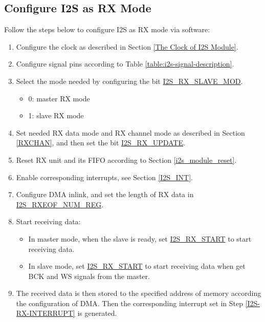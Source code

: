 \documentclass[main\_\_CN.tex]{subfiles}
\begin{document}
\subsection{ Configure I2S as RX Mode}\label{sec:configure-i2s-as-rx-mode}
Follow the steps below to configure I2S as RX mode via software:

\begin{enumerate}
    \item Configure the clock as described in Section  \ref{The Clock of I2S Module}.

    \item Configure signal pins according to Table  \ref{table:i2s-signal-description}.

    \item Select the mode needed by configuring the bit \hyperref[fielddesc:I2SRXSLAVEMOD]{ I2S\_RX\_SLAVE\_MOD}.
    \begin{itemize}
        \item 0: master RX mode
        \item 1: slave RX mode
    \end{itemize}

    \item Set needed RX data mode and RX channel mode as described in Section  \ref{RXCHAN}, and then set the bit  \hyperref[fielddesc:I2SRXUPDATE]{I2S\_RX\_UPDATE}.

    \item Reset RX unit and its FIFO according to Section  \ref{i2s_module_reset}.
    \item Enable corresponding interrupts, see Section  \ref{I2S_INT}.\label{I2S-RX-INTERRUPT}

    \item Configure DMA inlink, and set the length of RX data in  \hyperref[regdesc:I2SRXEOFNUMREG]{I2S\_RXEOF\_NUM\_REG}.

    \item Start receiving data:
    \begin{itemize}
        \item In master mode, when the slave is ready, set  \hyperref[fielddesc:I2SRXSTART]{I2S\_RX\_START} to start receiving data.
        \item In slave mode, set  \hyperref[fielddesc:I2SRXSTART]{I2S\_RX\_START} to start receiving data when get BCK and WS signals from the master.
    \end{itemize}
    \item The received data is then stored to the specified address of  \chipname{} memory according the configuration of DMA. Then the corresponding interrupt set in Step  \ref{I2S-RX-INTERRUPT} is generated.
\end{enumerate}
\end{document}
